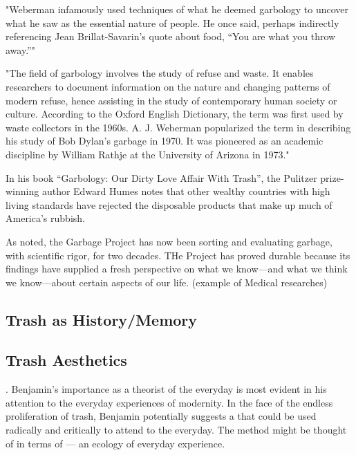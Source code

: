 "Weberman infamously used techniques of what he deemed garbology to uncover what he saw as the essential nature of people. He once said, perhaps indirectly referencing Jean Brillat-Savarin’s quote about food, “You are what you throw away.”" \cite{lukas2012garbage}

"The field of garbology involves the study of refuse and waste. It enables researchers to document information on the nature and changing patterns of modern refuse, hence assisting in the study of contemporary human society or culture. According to the Oxford English Dictionary, the term was first used by waste collectors in the 1960s. A. J. Weberman popularized the term in describing his study of Bob Dylan’s garbage in 1970. It was pioneered as an academic discipline by William Rathje at the University of Arizona in 1973."

In his book “Garbology: Our Dirty Love Affair With Trash”, the Pulitzer prize-winning author Edward Humes notes that other wealthy countries with high living standards have rejected the disposable products that make up much of America's rubbish.

As noted, the Garbage Project has now been sorting and evaluating garbage, with scientific rigor, for two decades. THe Project has proved durable because its findings have supplied a fresh perspective on what we know---and what we think we know---about certain aspects of our life. (example of Medical researches)

\subsection{Trash as History/Memory}
\cite{bullock2012trash}

\subsection{Trash Aesthetics}
  \cite{highmore2002thrashaesthetics}. Benjamin’s importance as a theorist of the everyday is most evident in his attention to the everyday experiences of modernity. In the face of the endless proliferation of trash, Benjamin potentially suggests a  that could be used radically and critically to attend to the everyday. The method might be thought of in terms of  --- an ecology of everyday experience.


